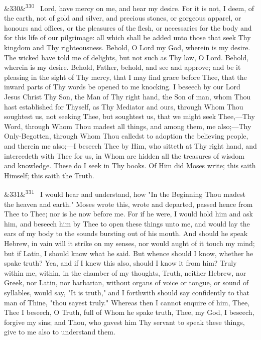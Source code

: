 \documentclass[12pt]{article}
\newcommand{\para}[1][]{\par\noindent\ifx&#1&\else\textsuperscript{\footnotesize #1}~\fi}
\begin{document}
\para[330] Lord, have mercy on me, and hear my desire. For it is not, I deem, of the earth, not of gold and silver, and precious stones, or gorgeous apparel, or honours and offices, or the pleasures of the flesh, or necessaries for the body and for this life of our pilgrimage: all which shall be added unto those that seek Thy kingdom and Thy righteousness. Behold, O Lord my God, wherein is my desire. The wicked have told me of delights, but not such as Thy law, O Lord. Behold, wherein is my desire. Behold, Father, behold, and see and approve; and be it pleasing in the sight of Thy mercy, that I may find grace before Thee, that the inward parts of Thy words be opened to me knocking. I beseech by our Lord Jesus Christ Thy Son, the Man of Thy right hand, the Son of man, whom Thou hast established for Thyself, as Thy Mediator and ours, through Whom Thou soughtest us, not seeking Thee, but soughtest us, that we might seek Thee,---Thy Word, through Whom Thou madest all things, and among them, me also;---Thy Only-Begotten, through Whom Thou calledst to adoption the believing people, and therein me also;---I beseech Thee by Him, who sitteth at Thy right hand, and intercedeth with Thee for us, in Whom are hidden all the treasures of wisdom and knowledge. These do I seek in Thy books. Of Him did Moses write; this saith Himself; this saith the Truth.

\para[331] I would hear and understand, how "In the Beginning Thou madest the heaven and earth." Moses wrote this, wrote and departed, passed hence from Thee to Thee; nor is he now before me. For if he were, I would hold him and ask him, and beseech him by Thee to open these things unto me, and would lay the ears of my body to the sounds bursting out of his mouth. And should he speak Hebrew, in vain will it strike on my senses, nor would aught of it touch my mind; but if Latin, I should know what he said. But whence should I know, whether he spake truth? Yea, and if I knew this also, should I know it from him? Truly within me, within, in the chamber of my thoughts, Truth, neither Hebrew, nor Greek, nor Latin, nor barbarian, without organs of voice or tongue, or sound of syllables, would say, "It is truth," and I forthwith should say confidently to that man of Thine, "thou sayest truly." Whereas then I cannot enquire of him, Thee, Thee I beseech, O Truth, full of Whom he spake truth, Thee, my God, I beseech, forgive my sins; and Thou, who gavest him Thy servant to speak these things, give to me also to understand them.
\end{document}
